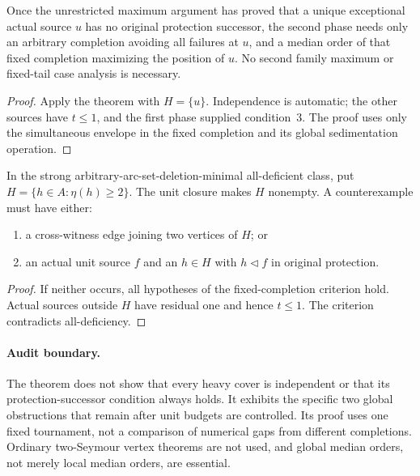 \begin{corollary}
\label{cor:one-heavy-second-phase-fixed}
Once the unrestricted maximum argument has proved that a unique
exceptional actual source $u$ has no original protection successor,
the second phase needs only an arbitrary completion avoiding all
failures at $u$, and a median order of that fixed completion maximizing
the position of $u$. No second family maximum or fixed-tail case
analysis is necessary.
\end{corollary}
\begin{proof}
Apply the theorem with $H=\{u\}$. Independence is automatic;
the other sources have $t\le1$, and the first phase supplied
condition~3. The proof uses only the simultaneous envelope in the
fixed completion and its global sedimentation operation.
\end{proof}

\begin{corollary}
\label{cor:heavy-heavy-edge-or-protected-unit}
In the strong arbitrary-arc-set-deletion-minimal all-deficient class,
put $H=\{h\in A:\eta(h)\ge2\}$. The unit closure makes
$H$ nonempty. A counterexample must have either:
\begin{enumerate}
\item a cross-witness edge joining two vertices of $H$; or
\item an actual unit source $f$ and an $h\in H$ with
$h\triangleleft f$ in original protection.
\end{enumerate}
\end{corollary}
\begin{proof}
If neither occurs, all hypotheses of the fixed-completion criterion
hold. Actual sources outside $H$ have residual one and hence $t\le1$.
The criterion contradicts all-deficiency.
\end{proof}

\paragraph{Audit boundary.}
The theorem does not show that every heavy cover is independent or
that its protection-successor condition always holds. It exhibits
the specific two global obstructions that remain after unit budgets
are controlled. Its proof uses one fixed tournament, not a comparison
of numerical gaps from different completions. Ordinary two-Seymour
vertex theorems are not used, and global median orders, not merely
local median orders, are essential.

